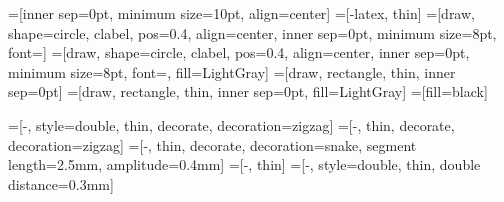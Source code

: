 =[inner sep=0pt, minimum size=10pt, align=center]
=[-latex, thin]
=[draw, shape=circle, clabel, pos=0.4, align=center, inner sep=0pt, minimum size=8pt, font=\tiny]
=[draw, shape=circle, clabel, pos=0.4, align=center, inner sep=0pt, minimum size=8pt, font=\tiny, fill=LightGray]
=[draw, rectangle, thin, inner sep=0pt]
=[draw, rectangle, thin, inner sep=0pt, fill=LightGray]
=[fill=black]

=[-, style=double, thin, decorate, decoration=zigzag]
=[-, thin, decorate, decoration=zigzag]
=[-, thin, decorate, decoration={snake, segment length=2.5mm, amplitude=0.4mm}]
=[-, thin]
=[-, style=double, thin, double distance=0.3mm]


\newcommand{\transcript}[3]
{
    \foreach[count=\i] \r/\t/\g in {#2}
    {
    	\node[n] (read_\i) at (0.4*\i,#3*0.4) {\r};
		\node[n] (genome_\i)  at (0.4*\i,-1) {\g};
			\draw[e] (read_\i.south)+(0,-#3*0.4) -- (genome_\i) node[m] (transcript_\i) {\t};
    }
    
    \begin{pgfonlayer}{background} 
		\draw[tape] ([xshift=0.1cm, yshift=-0.01cm]transcript_1.north west)
				rectangle
					([xshift=-0.1cm, yshift=0.01cm]transcript_#1.south east) ;
	\end{pgfonlayer}
}

\newcommand{\band}[1]
{

	\draw[line] (genome_1.north west) -- (genome_#1.north east) ;
	\draw[line] (genome_1.south west) -- (genome_#1.south east) ;
	\draw[wave] (genome_1.north west) -- (genome_1.south west) ;
	\draw[wave] (genome_#1.north east) -- (genome_#1.south east) ;
}

\newcommand{\seed}[3]
{
	\ifthenelse{\equal{#3}{0}}
    {

	    \begin{pgfonlayer}{background} 
    		\draw[covered] (read_#1.north west) rectangle (read_#2.south east) ;
		\end{pgfonlayer}
    }
           
	\node[frame] (read_rect) [transform shape, fit = (read_#1) (read_#2)] {};
}


